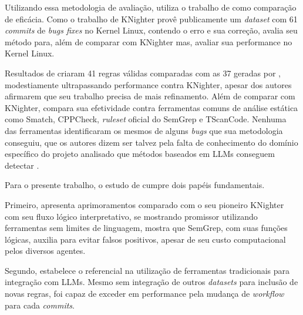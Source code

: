\documentclass[
    12pt,                %
    openright,           %
    oneside,             %
    a4paper,             %
    english,             %
    brazil               %
]{abntex2}
\begin{document}
\par
Utilizando essa metodologia de avaliação,  utiliza o trabalho de  como comparação de eficácia.
Como o trabalho de KNighter provê publicamente um \textit{dataset} com 61 \textit{commits} de \textit{bugs fixes} no Kernel Linux, contendo o erro e sua correção,  avalia seu método para, além de comparar com KNighter mas, avaliar sua performance no Kernel Linux.
\par
Resultados de  criaram 41 regras válidas comparadas com as 37 geradas por , modestiamente ultrapassando performance contra KNighter, apesar dos autores afirmarem que seu trabalho precisa de mais refinamento. 
Além de comparar com KNighter,  compara sua efetividade contra ferramentas comuns de análise estática como Smatch, CPPCheck, \textit{ruleset} oficial do SemGrep e TScanCode.
Nenhuma das ferramentas identificaram os mesmos de alguns \textit{bugs} que sua metodologia conseguiu, que os autores dizem ser talvez pela falta de conhecimento do domínio específico do projeto analisado que métodos baseados em LLMs conseguem detectar \cite{hou2025generation}. 
\par
Para o presente trabalho, o estudo de  cumpre dois papéis fundamentais.
\par
Primeiro, apresenta aprimoramentos comparado com o seu pioneiro KNighter com seu fluxo lógico interpretativo, se mostrando promissor utilizando ferramentas sem limites de linguagem,  mostra que SemGrep, com suas funções lógicas, auxilia para evitar falsos positivos, apesar de seu custo computacional pelos diversos agentes.
\par
Segundo, estabelece o referencial na utilização de ferramentas tradicionais para integração com LLMs.
Mesmo sem integração de outros \textit{datasets} para inclusão de novas regras,  foi capaz de exceder em performance pela mudança de \textit{workflow} para cada \textit{commits}.
\end{document}

